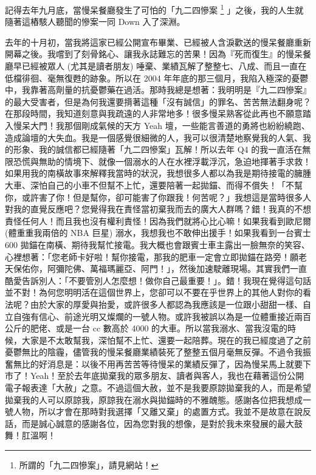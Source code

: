 記得去年九月底，當慢呆餐廳發生了可怕的「九二四慘案%
\footnote{所謂的「九二四慘案」，請見網站！}%
」之後，我的人生就隨著這樁駭人聽聞的慘案一同 Down 入了深淵。

去年的十月初，當我將這家已經公開宣布畢業、已經被人含淚歡送的慢呆餐廳重新開幕之後。我嚐到了刻骨銘心、讓我永誌難忘的苦果！因為『死而復生』的慢呆餐廳早已經被眾人 (尤其是讀者朋友) 唾棄、業績瓦解了整整七、八成、而且一直在低檔徘徊、毫無復甦的跡象。所以在 2004 年年底的那三個月，我陷入極深的憂鬱中，我靠著高劑量的抗憂鬱藥在過活。那時我總是想著：我明明是『九二四慘案』的最大受害者，但是為何我還要揹著這種「沒有誠信」的罪名、苦苦無法翻身呢？在那段時間，我知道刻意與我疏遠的人非常地多！很多慢呆熟客從此再也不願意踏入慢呆大門！我那個剛成氣候的天方 Yeah 壇，一些能言善道的勇將也紛紛繞跑、造成論壇的大失血。我是一個感覺很細微的人，我可以很清楚地察覺我的人氣、我的形象、我的誠信都已經隨著「九二四慘案」瓦解！所以去年 Q4 的我一直活在無限恐慌與無助的情境下、就像一個溺水的人在水裡浮載浮沉，急迫地揮著手求救！如果用我的南橫故事來解釋我當時的狀況，我想很多人都以為我是期待接電的臃腫大車、深怕自己的小車不但幫不上忙，還要陪著一起拋錨、而得不償失！「不幫你，或許害了你！但是幫你，卻可能害了你跟我！何苦呢？」我想這是當時很多人對我的直覺反應吧？您覺得我在責怪當初棄我而去的廣大人群嗎？錯！我真的不想責怪任何人！而且我也沒有權利責怪！因為我們就將心比心嘛！如果我看到歐尼爾 (體重重我兩倍的 NBA 巨星) 溺水，我想我也不敢伸出援手！如果我看到一台賓士 600 拋錨在南橫、期待我幫忙接電。我大概也會跟賓士車主露出一臉無奈的笑容、心裡想著：「您老師卡好啦！幫你接電，那我的肥車一定會立即拋錨在路旁！願老天保佑你，阿彌陀佛、萬福瑪麗亞、阿門！」，然後加速駛離現場。其實我們一直酷愛告訴別人：「不要管別人怎麼想！做你自己最重要！」。錯！我現在覺得這句話並不對！為何您明明活在這個世界上，您卻可以不要在乎世界上的其他人對你的看法呢？由於大家的厚愛與抬愛，或許很多人都認為我應該是一位跟小甜甜一樣、自立自強有信心、前途光明又燦爛的一號人物。或許我被誤以為是一位體重接近兩百公斤的肥佬、或是一台 cc 數高於 4000 的大車。所以當我溺水、當我沒電的時候，大家是不太敢幫我，深怕幫不上忙、還要一起陪葬。現在的我已經度過了之前憂鬱無比的陰霾，儘管我的慢呆餐廳業績裝死了整整五個月毫無反彈。不過令我振奮無比的好消息是：以後不用再苦苦等待慢呆的業績反彈了，因為慢呆馬上就要下市了！Yeah！至於去年底拋棄我的眾多朋友、讀者與客人，我也在藉著這份公開電子報表達「大赦」之意。不過這個大赦，並不是我要原諒拋棄我的人，而是希望拋棄我的人可以原諒我，原諒我在溺水與拋錨時的不雅醜態。感謝各位把我想成一號人物，所以才會在那時對我選擇「又離又棄」的處置方式。我並不是故意在說反話，而是誠心誠意的感謝各位，因為您對我的想像，是對於我未來發展的最大鼓舞！肛溫啊！



